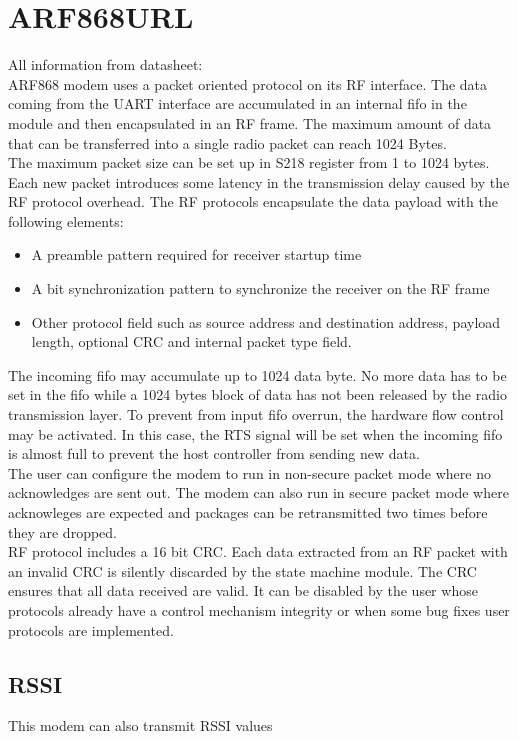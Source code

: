 \section{ARF868URL}
All information from datasheet:\\
ARF868 modem uses a packet oriented protocol on its RF interface. The data coming from the UART interface are accumulated in an internal fifo in the module and then encapsulated in an RF frame. The maximum amount of data that can be transferred into a single radio packet can reach 1024 Bytes.\\
The maximum packet size can be set up in S218 register from 1 to 1024 bytes. Each new packet introduces some latency in the transmission 
delay caused by the RF protocol overhead. The RF protocols encapsulate the data payload with the following elements:
\begin{itemize}
    \item  A preamble pattern required for receiver startup time
    \item A bit synchronization pattern to synchronize the receiver on the RF frame
    \item Other protocol field such as source address and destination address, payload length, optional CRC and internal packet type field.
\end{itemize}
The incoming fifo may accumulate up to 1024 data byte. No more data has to be set in the fifo while a 1024 bytes block of data has not been released by the radio transmission layer. To prevent from input fifo overrun, the hardware flow control may be activated. In this case, the RTS signal will be set when the incoming fifo is almost full to prevent the host controller from sending new data.\\
The user can configure the modem to run in non-secure packet mode where no acknowledges are sent out. The modem can also run in secure packet mode where acknowleges are expected and packages can be retransmitted two times before they are dropped. \\
RF protocol includes a 16 bit CRC. Each data extracted from an RF packet with an invalid CRC is silently discarded by the state machine module. The CRC ensures that all data received are valid. It can be disabled by the user whose protocols already have a control mechanism integrity or when some bug fixes user protocols are implemented.
%
\subsection{RSSI}
This modem can also transmit RSSI values